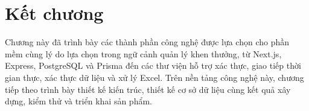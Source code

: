 \documentclass[../DoAn.tex]{subfiles}
\begin{document}
\section*{Kết chương}

Chương này đã trình bày các thành phần công nghệ được lựa chọn cho phần mềm cùng lý do lựa chọn trong ngữ cảnh quản lý khen thưởng, từ Next.js, Express, PostgreSQL và Prisma đến các thư viện hỗ trợ xác thực, giao tiếp thời gian thực, xác thực dữ liệu và xử lý Excel. Trên nền tảng công nghệ này, chương tiếp theo trình bày thiết kế kiến trúc, thiết kế cơ sở dữ liệu cùng kết quả xây dựng, kiểm thử và triển khai sản phẩm.
\end{document}
